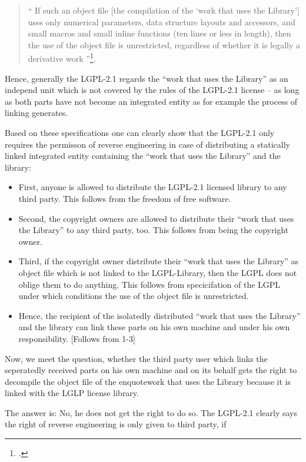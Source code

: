 \begin{quote}\enquote{ If such an object file [the compilation of the
\enquote{work that uses the Library}] uses only numerical parameters, data structure
layouts and accessors, and small macros and small inline functions (ten lines or
less in length), then the use of the object file is unrestricted, regardless of
whether it is legally a derivative work }\footcite[cf.][\nopage wp
§5]{Lgpl21OsiLicense1999a}.
\end{quote}

Hence, generally the LGPL-2.1 regards the \enquote{work that uses the Library}
as an independ unit which is not covered by the rules of the LGPL-2.1 license --
as long as both parts have not become an integrated entity as for example the
process of linking generates.

Based on these specifications one can clearly show that the LGPL-2.1 only
requires the permisson of reverse engineering in case of distributing a
statically linked integrated entity containing the \enquote{work that uses the
Library} and the library:

\begin{itemize}
\item First, anyone is allowed to distribute the LGPL-2.1 licensed library to
any third party. This follows from the freedom of free software.

\item Second, the copyright owners are allowed to distribute their \enquote{work
that uses the Library} to any third party, too. This follows from being the copyright
owner.

\item Third, if the copyright owner distribute their \enquote{work that
uses the Library} as object file which is not linked to the LGPL-Library, then
the LGPL does not oblige them to do anything. This follows from specicifation of
the LGPL under which conditions the use of the object file is unrestricted.

\item Hence, the recipient of the isolatedly distributed \enquote{work
that uses the Library} and the library can link these parts on his own machine
and under his own responsibility. [Follows from 1-3]
\end{itemize}

Now, we meet the question, whether the third party user which links the
seperatedly received parts on his own machine and on its behalf gets the right
to decompile the object file of the enquote{work that uses the Library} because it
is linked with the LGLP license library.

The answer is: No, he does not get the right to do so. The LGPL-2.1 clearly says
the right of reverse engineering is only given to third party, if 

%
